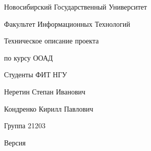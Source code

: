 \begin{center}
	{\large Новосибирский Государственный Университет
		
		Факультет Информационных Технологий}
\end{center}

\begin{flushright}
	\bfseries{\huge Техническое описание проекта
		
		по курсу ООАД
		
		\bigskip
		
		\ProjectName
		
		\bigskip
		
		Студенты ФИТ НГУ
		
		Неретин Степан Иванович
		
		Кондренко Кирилл Павлович
		
		Группа 21203}
	
	\bigskip
	
	{\large Версия \ProjectVersion}
\end{flushright}
